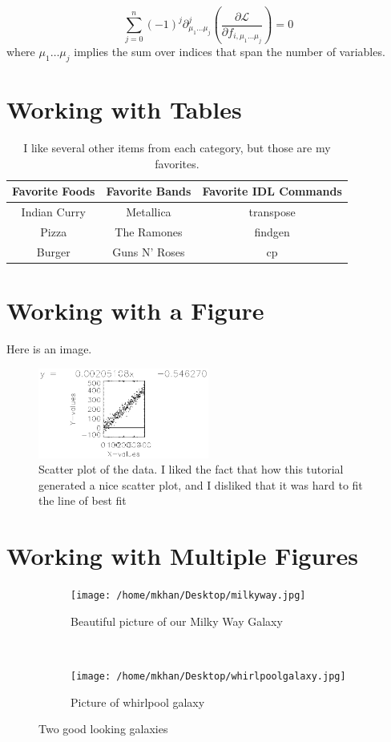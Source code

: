 \documentclass[12pt]{article}
\begin{document}
\[
\sum_{j=0}^n (-1)^j \partial_{ \mu_{1}\ldots\mu_{j} }^j\left(\frac{
\partial \mathcal{L} }{\partial f_{i, \mu_1 \dots \mu_{j} } }\right
 ) = 0
\]
where $\mu_{1}\ldots \mu_{j}$ implies the sum over indices that span the
number of variables.

\section{Working with Tables}

\begin{table}[h!]
 \centering
 \begin{tabular}{ c | c | c }
 \hline
 Favorite Foods & Favorite Bands & Favorite IDL Commands \\ \hline
 Indian Curry & Metallica & transpose \\
 Pizza & The Ramones & findgen \\
 Burger & Guns N' Roses & cp \\ \hline
\end{tabular}
 \caption{I like several other items from each category, but those are my favorites.}
\end{table}

\section{Working with a Figure}
Here is an image. 
\begin{figure}[H]
 \centering
 \includegraphics[width=0.5\textwidth]{plot.ps}
 \caption{Scatter plot of the data. I liked the fact that how this tutorial generated a nice scatter plot, and I disliked that it was hard to fit the line of best fit}
\end{figure}

\section{Working with Multiple Figures}

\begin{figure}[H]
 \centering

 \begin{subfigure}[h!]{0.5\textwidth}
 \texttt{[image: /home/mkhan/Desktop/milkyway.jpg]}
 \caption{Beautiful picture of our Milky Way Galaxy}
 \end{subfigure}
 ~
 \begin{subfigure}[h!]{0.5\textwidth}
 \texttt{[image: /home/mkhan/Desktop/whirlpoolgalaxy.jpg]}
 \caption{Picture of whirlpool galaxy}
 \end{subfigure}
 \caption{Two good looking galaxies}

\end{figure}
\end{document}
